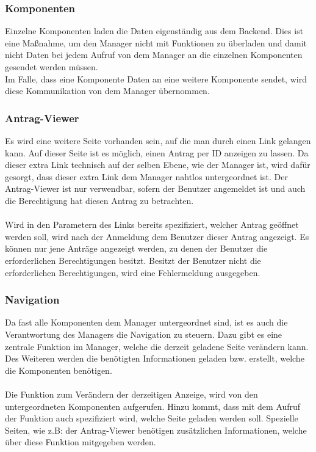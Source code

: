 \subsubsection{Komponenten}
Einzelne Komponenten laden die Daten eigenständig aus dem Backend. Dies ist eine Maßnahme, um den Manager nicht mit Funktionen zu überladen und damit nicht Daten bei jedem Aufruf von dem Manager an die einzelnen Komponenten gesendet werden müssen.\\
Im Falle, dass eine Komponente Daten an eine weitere Komponente sendet, wird diese Kommunikation von dem Manager übernommen.

\subsubsection{Antrag-Viewer}
Es wird eine weitere Seite vorhanden sein, auf die man durch einen Link gelangen kann. Auf dieser Seite ist es möglich, einen Antrag per ID anzeigen zu lassen. Da dieser extra Link technisch auf der selben Ebene, wie der Manager ist, wird dafür gesorgt, dass dieser extra Link dem Manager nahtlos untergeordnet ist. Der Antrag-Viewer ist nur verwendbar, sofern der Benutzer angemeldet ist und auch die Berechtigung hat diesen Antrag zu betrachten.
\\\\
Wird in den Parametern des Links bereits spezifiziert, welcher Antrag geöffnet werden soll, wird nach der Anmeldung dem Benutzer dieser Antrag angezeigt. Es können nur jene Anträge angezeigt werden, zu denen der Benutzer die erforderlichen Berechtigungen besitzt. Besitzt der Benutzer nicht die erforderlichen Berechtigungen, wird eine Fehlermeldung ausgegeben.

\subsubsection{Navigation}
Da fast alle Komponenten dem Manager untergeordnet sind, ist es auch die Verantwortung des Managers die Navigation zu steuern. Dazu gibt es eine zentrale Funktion im Manager, welche die derzeit geladene Seite verändern kann. Des Weiteren werden die benötigten Informationen geladen bzw. erstellt, welche die Komponenten benötigen.
\\\\
Die Funktion zum Verändern der derzeitigen Anzeige, wird von den untergeordneten Komponenten aufgerufen. Hinzu kommt, dass mit dem Aufruf der Funktion auch spezifiziert wird, welche Seite geladen werden soll. Spezielle Seiten, wie z.B: der Antrag-Viewer benötigen zusätzlichen Informationen, welche über diese Funktion mitgegeben werden.

